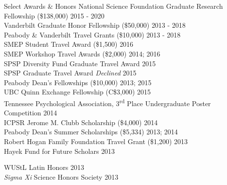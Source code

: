 \begin{rSection}{\textrm{Select Awards \& Honors}}
National Science Foundation Graduate Research Fellowship (\$138,000) 	\hfill{2015 - 2020}\smallskip\\
Vanderbilt Graduate Honor Fellowship (\$50,000)				\hfill{2013 - 2018}\smallskip\\	
Peabody \& Vanderbilt Travel Grants (\$10,000)				\hfill  {2013 - 2018}\smallskip\\
SMEP Student Travel Award (\$1,500)						\hfill{2016}\smallskip\\
SMEP Workshop Travel Awards (\$2,000)					\hfill{2014; 2016}\smallskip\\
SPSP Diversity Fund Graduate Travel Award %
\hfill{2015}\smallskip\\
SPSP Graduate Travel Award %
{\small \textit{Declined}} \hfill{2015}\smallskip\\
Peabody Dean's Fellowships (\$10,000)					\hfill  {2013; 2015}\smallskip\\
UBC Quinn Exchange Fellowship (C\$3,000) \hfill{2015}\smallskip\\
Tennessee Psychological Association, 3\textsuperscript{rd} Place Undergraduate Poster Competition \hfill{2014}\smallskip\\
ICPSR Jerome M. Clubb Scholarship (\$4,000) \hfill{2014}\smallskip\\
Peabody Dean's Summer Scholarships (\$5,334)			    \hfill  {2013; 2014}\smallskip\\	
Robert Hogan Family Foundation Travel Grant (\$1,200) 	\hfill  {2013}\smallskip\\
Hayek Fund for Future Scholars                      \hfill{2013}\smallskip\\
\begin{minipage}{\linewidth}
\vspace{1.1mm} WUStL Latin Honors \hfill{2013}\smallskip\\
\textit{Sigma Xi} Science Honors Society   	\hfill  {2013}
\end{minipage}%
\end{rSection}

